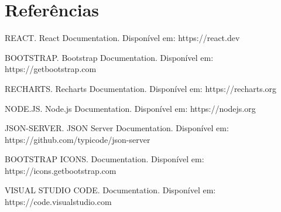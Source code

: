 \documentclass[12pt,oneside,a4paper,chapter=TITLE]{abntex2}
\begin{document}
\chapter*{Referências}

REACT. React Documentation. Disponível em: https://react.dev

BOOTSTRAP. Bootstrap Documentation. Disponível em: https://getbootstrap.com

RECHARTS. Recharts Documentation. Disponível em: https://recharts.org

NODE.JS. Node.js Documentation. Disponível em: https://nodejs.org

JSON-SERVER. JSON Server Documentation. Disponível em: https://github.com/typicode/json-server

BOOTSTRAP ICONS. Documentation. Disponível em: https://icons.getbootstrap.com

VISUAL STUDIO CODE. Documentation. Disponível em: https://code.visualstudio.com
\end{document}
